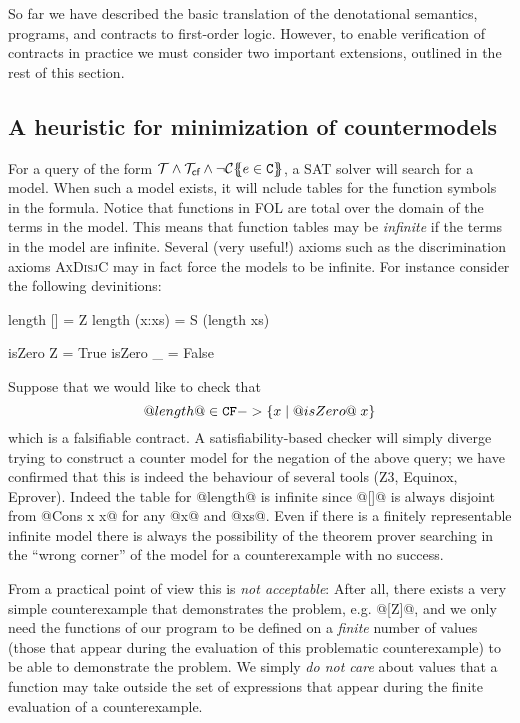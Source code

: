 So far we have described the basic translation of the denotational semantics, programs, and contracts
to first-order logic. However, to enable verification of contracts in practice we must consider two 
important extensions, outlined in the rest of this section.

\subsection{A heuristic for minimization of countermodels}\label{sect:minimization}

For a query of the form $\Th \land \Th_\lcfZ \land \neg \ctrans{}{P}{e \in \Ct}$, a SAT solver will search for
a model. When such a model exists, it will nclude tables for the function symbols in the formula. Notice that functions 
in FOL are total over the domain of the terms in the model. This means that function tables may be {\em infinite} if the 
terms in the model are infinite. Several (very useful!) axioms such as the discrimination axioms \textsc{AxDisjC} may in 
fact force the models to be infinite. For instance consider the following devinitions:
\begin{code}
length [] = Z
length (x:xs) = S (length xs)

isZero Z = True
isZero _ = False
\end{code}
Suppose that we would like to check that 
   \[ @length@ \in \CF -> \{ x \mid @isZero@\;x\} \]
which is a falsifiable contract.  A satisfiability-based checker 
will simply diverge trying to construct a counter model for the negation of the above query; we 
have confirmed that this is indeed the behaviour of several tools (Z3, Equinox, Eprover).
Indeed the table for @length@ is infinite since @[]@ is always disjoint from @Cons x x@ for 
any @x@ and @xs@. Even if there is a finitely representable infinite model there is always the 
possibility of the theorem prover searching in the ``wrong corner'' of the model for a 
counterexample with no success. 

From a practical point of view this is {\em not acceptable}: After all, there exists a very simple 
counterexample that demonstrates the problem, e.g. @[Z]@, and we only need the 
functions of our program to be defined on a {\em finite} number of values (those that appear 
during the evaluation of this problematic counterexample) to be able to demonstrate 
the problem. We simply {\em do not care} about values that a function may take outside 
the set of expressions that appear during the finite evaluation of a counterexample.

